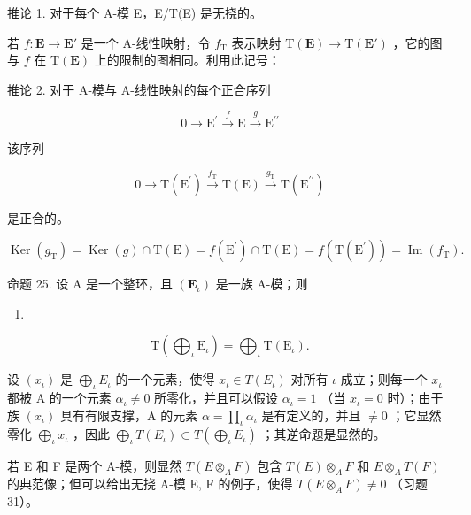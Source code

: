 推论 1. 对于每个 A-模 E，E/T(E) 是无挠的。

若 \(f: \mathbf{E} \to \mathbf{E}'\) 是一个 A-线性映射，令 \(f_{\mathrm{T}}\) 表示映射 \(\mathrm{T}(\mathbf{E}) \to \mathrm{T}(\mathbf{E}')\) ，它的图与 \(f\) 在 \(\mathrm{T}(\mathbf{E})\) 上的限制的图相同。利用此记号：

推论 2. 对于 A-模与 A-线性映射的每个正合序列

\[
0 \longrightarrow \mathrm{E} ^ {\prime} \stackrel {f} {\longrightarrow} \mathrm{E} \stackrel {g} {\longrightarrow} \mathrm{E} ^ {\prime \prime}
\]

该序列

\[
0 \longrightarrow \mathrm{T} (\mathrm{E} ^ {\prime}) \xrightarrow {f _ {\mathrm{T}}} \mathrm{T} (\mathrm{E}) \xrightarrow {g _ {\mathrm{T}}} \mathrm{T} (\mathrm{E} ^ {\prime \prime})
\]

是正合的。

\[
\operatorname{Ker} \left(g _ {\mathrm{T}}\right) = \operatorname{Ker} (g) \cap \mathrm{T} (\mathrm{E}) = f \left(\mathrm{E} ^ {\prime}\right) \cap \mathrm{T} (\mathrm{E}) = f \left(\mathrm{T} \left(\mathrm{E} ^ {\prime}\right)\right) = \operatorname{Im} \left(f _ {\mathrm{T}}\right).
\]

命题 25. 设 A 是一个整环，且 \((\mathbf{E}_{\iota})\) 是一族 A-模；则

\begin{enumerate}
\def\labelenumi{(\arabic{enumi})}
\setcounter{enumi}{36}
\tightlist
\item
\end{enumerate}

\[
\mathrm{T} \left(\bigoplus_ {\iota} \mathrm{E} _ {\iota}\right) = \bigoplus_ {\iota} \mathrm{T} (\mathrm{E} _ {\iota}).
\]

设 \((x_{\iota})\) 是 \(\bigoplus_{\iota} E_{\iota}\) 的一个元素，使得 \(x_{\iota} \in T(E_{\iota})\) 对所有 \(\iota\) 成立；则每一个 \(x_{\iota}\) 都被 A 的一个元素 \(\alpha_{\iota} \neq 0\) 所零化，并且可以假设 \(\alpha_{\iota} = 1\) （当 \(x_{\iota} = 0\) 时）；由于族 \((x_{\iota})\) 具有有限支撑，A 的元素 \(\alpha = \prod_{\iota} \alpha_{\iota}\) 是有定义的，并且 \(\neq 0\) ；它显然零化 \(\bigoplus_{\iota} x_{\iota}\) ，因此 \(\bigoplus_{\iota} T(E_{\iota}) \subset T\left(\bigoplus_{\iota} E_{\iota}\right)\) ；其逆命题是显然的。

若 E 和 F 是两个 A-模，则显然 \(T(E \otimes_{A} F)\) 包含 \(T(E) \otimes_{A} F\) 和 \(E \otimes_{A} T(F)\) 的典范像；但可以给出无挠 A-模 E, F 的例子，使得 \(T(E \otimes_{A} F) \neq 0\) （习题 31）。

